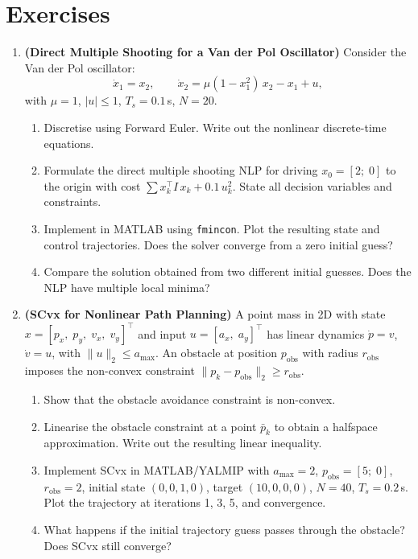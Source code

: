 \section*{Exercises}
\begin{enumerate}

\item \textbf{(Direct Multiple Shooting for a Van der Pol Oscillator)}
Consider the Van der Pol oscillator:
\[
\dot{x}_1 = x_2, \qquad \dot{x}_2 = \mu(1 - x_1^2)\,x_2 - x_1 + u,
\]
with $\mu = 1$, $|u| \le 1$, $T_s = 0.1$\,s, $N = 20$.
\begin{enumerate}
	\item Discretise using Forward Euler. Write out the nonlinear discrete-time equations.
	\item Formulate the direct multiple shooting NLP for driving $x_0 = [2;\; 0]$ to the origin with cost $\sum x_k^\top I\, x_k + 0.1\, u_k^2$. State all decision variables and constraints.
	\item Implement in MATLAB using \texttt{fmincon}. Plot the resulting state and control trajectories. Does the solver converge from a zero initial guess?
	\item Compare the solution obtained from two different initial guesses. Does the NLP have multiple local minima?
\end{enumerate}

\item \textbf{(SCvx for Nonlinear Path Planning)}
A point mass in 2D with state $x = [p_x,\; p_y,\; v_x,\; v_y]^\top$ and input $u = [a_x,\; a_y]^\top$ has linear dynamics $\dot{p} = v$, $\dot{v} = u$, with $\|u\|_2 \le a_{\max}$. An obstacle at position $p_{\text{obs}}$ with radius $r_{\text{obs}}$ imposes the non-convex constraint $\|p_k - p_{\text{obs}}\|_2 \ge r_{\text{obs}}$.
\begin{enumerate}
	\item Show that the obstacle avoidance constraint is non-convex.
	\item Linearise the obstacle constraint at a point $\bar{p}_k$ to obtain a halfspace approximation. Write out the resulting linear inequality.
	\item Implement SCvx in MATLAB/YALMIP with $a_{\max} = 2$, $p_{\text{obs}} = [5;\; 0]$, $r_{\text{obs}} = 2$, initial state $(0, 0, 1, 0)$, target $(10, 0, 0, 0)$, $N = 40$, $T_s = 0.2$\,s. Plot the trajectory at iterations 1, 3, 5, and convergence.
	\item What happens if the initial trajectory guess passes through the obstacle? Does SCvx still converge?
\end{enumerate}


\end{enumerate}

